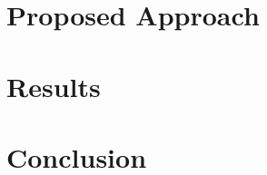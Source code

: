 \documentclass{ieeeaccess}
\begin{document}
\section{Proposed Approach}

  \lipsum[1-2]


\section{Results}

  \lipsum[1-2]

\section{Conclusion}

  \lipsum[1-2]

\EOD
\end{document}
